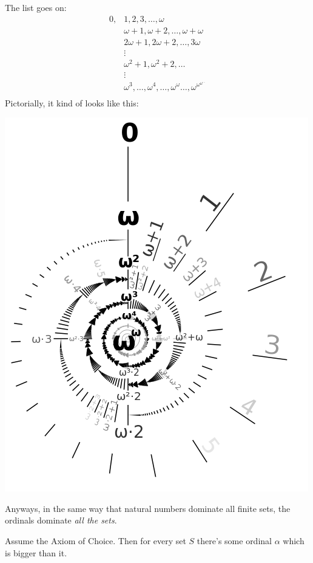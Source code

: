 The list goes on:
\[
\begin{aligned}
	0, & 1, 2, 3, \dots, \omega \\
	& \omega+1, \omega+2, \dots, \omega+\omega \\
	& 2\omega+1, 2\omega+2, \dots, 3\omega \\
	& \vdots \\
	& \omega^2 + 1, \omega^2+2, \dots \\
	& \vdots \\
	& \omega^3, \dots, \omega^4, \dots, \omega^\omega
	\dots, \omega^{\omega^{\omega^{\dots}}} \\
\end{aligned}
\]
Pictorially, it kind of looks like this:
\begin{center}
	\includegraphics[scale=0.70]{media/500px-Omega-exp-omega-labeled.png}
\end{center}
Anyways, in the same way that natural numbers dominate all finite sets,
the ordinals dominate \emph{all the sets}.
\begin{theorem}
	Assume the Axiom of Choice.
	Then for every set $S$ there's some ordinal $\alpha$ which is bigger than it.
\end{theorem}

